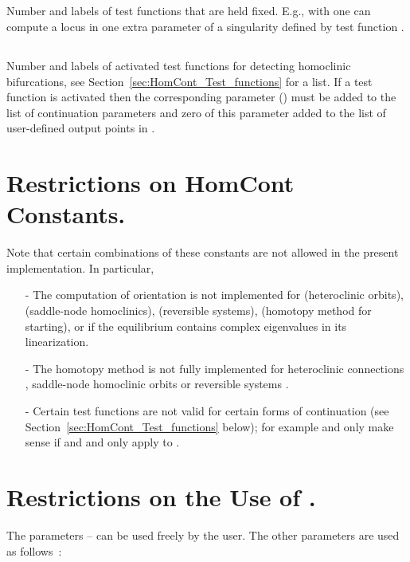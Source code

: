 \documentclass[12pt]{report}
\begin{document}
\subsection{}  \label{sec:IFIXED}
Number and labels of test functions that are held fixed. 
E.g., with  one can compute a locus in
one extra parameter of a singularity defined by 
test function .

\subsection{}  \label{sec:IPSI}
Number and labels of activated test functions for detecting homoclinic
bifurcations, see Section~\ref{sec:HomCont_Test_functions} 
for a list. If a test function is activated then the
corresponding parameter () 
must be added to the list of continuation parameters 
and zero of this parameter added to the list of user-defined
output points   in .

\section{ Restrictions on {\cal HomCont} Constants.}
Note that certain combinations of these constants are not allowed
in the present implementation. In particular,
\begin{itemize}
\item[-] 
The computation of orientation  is not
implemented for  (heteroclinic orbits), 
 (saddle-node homoclinics),
 (reversible systems),  (homotopy
method for starting), or if the equilibrium contains complex
eigenvalues in its linearization.  
\item[-] The homotopy method  is not fully implemented
for heteroclinic connections , saddle-node homoclinic
orbits  or reversible systems .
\item[-] Certain test functions are not valid for certain forms
of continuation 
(see Section~\ref{sec:HomCont_Test_functions} below); 
for example
 and  only make sense if 
 and  and  only apply
to .
\end{itemize}

\section{ Restrictions on the Use of .}
The parameters  --  can be used freely by
the user. The other parameters are used as follows~:
\end{document}
